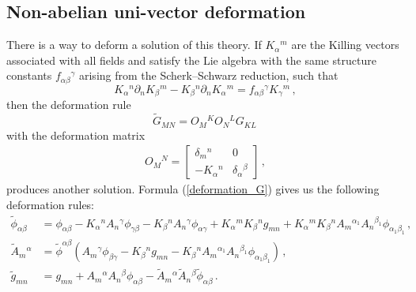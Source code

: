 \documentclass[12pt, utf8]{article}
\numberwithin{equation}{section}
\begin{document}
\subsection{Non-abelian uni-vector deformation}\label{GTRdef}

There is a way to deform a solution of this theory. If $K_{\alpha}{}^{m}$ are the Killing vectors associated with all fields and satisfy the Lie algebra with the same structure constants $f_{\alpha \beta}{}^{\gamma}$ arising from the Scherk–Schwarz reduction, such that
\begin{equation}
    K_{\alpha}{}^{n}\partial_{n} K_{\beta}{}^{m} -   K_{\beta}{}^{n}\partial_{n} K_{\alpha}{}^{m} = f_{\alpha \beta}{}^{\gamma} K_{\gamma}{}^{m} \, , 
\end{equation}
then the deformation rule 
\begin{equation} \label{deformation_G}
    \tilde{G}_{M N} = O_{M}{}^{K} O_{N}{}^{L} G_{K L} \, 
\end{equation}
with the deformation matrix 
\begin{equation}
    \begin{aligned}
  O_{M}{}^{N} = 
  \begin{bmatrix}
		    \delta_{m}{}^{n} & 0 \\
            - K_{\alpha}{}^{n} & \delta_{\alpha}{}^{\beta}
	     \end{bmatrix}  \, ,
    \end{aligned}
\end{equation}
produces another solution. Formula (\ref{deformation_G}) gives us the following deformation rules:
  \begin{equation}\label{GTRdefrules}
      \begin{aligned}
          \tilde{\phi}_{\alpha \beta} &= \phi_{\alpha \beta} - K_{\alpha}{}^{n} A_{n}{}^{\gamma} \phi_{\gamma \beta} - K_{\beta}{}^{n} A_{n}{}^{\gamma} \phi_{\alpha \gamma } + K_{\alpha}{}^{m} K_{\beta}{}^{n} g_{m n} + K_{\alpha}{}^{m} K_{\beta}{}^{n} A_{m}{}^{\alpha_1} A_{n}{}^{\beta_1} \phi_{\alpha_1 \beta_1} \, , \\
          \tilde{A}_{m}{}^{\alpha} &= \tilde{\phi}^{\alpha \beta} \left( A_{m}{}^{\gamma} \phi_{\beta \gamma} - K_{\beta}{}^{n} g_{m n} - K_{\beta}{}^{n} A_{m}{}^{\alpha_1} A_{n}{}^{\beta_1} \phi_{\alpha_1 \beta_1} \right) \, , \\
          \tilde{g}_{m n} &= g_{m n} + A_{m}{}^{\alpha} A_{n}{}^{\beta} \phi_{\alpha \beta} -   \tilde{A}_{m}{}^{\alpha} \tilde{A}_{n}{}^{\beta} \tilde{\phi}_{\alpha \beta} \, . 
      \end{aligned}
  \end{equation}
\end{document}
